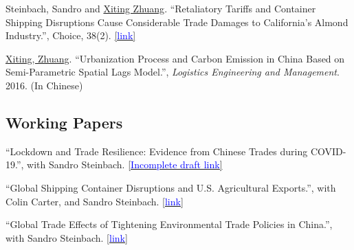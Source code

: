 \documentclass[11 pt,letterpaper]{article}
\renewenvironment{itemize}{
	\begin{list}{}{
			\setlength{\leftmargin}{1.5em}
		}
	}{
	\end{list}
}
\begin{document}
\begin{itemize}
	
	
	\item[-] Steinbach, Sandro and  \underline{Xiting Zhuang}. ``Retaliatory Tariffs and Container Shipping Disruptions Cause Considerable Trade Damages to California’s Almond Industry.'', Choice, 38(2).  	\href{https://econpapers.repec.org/scripts/redir.pf?u=https%3A%2F%2Fageconsearch.umn.edu%2Frecord%2F337188%2Ffiles%2FSteinbach_Retaliatory_38.pdf;h=repec:ags:aaeach:337188}{[{\underline{\textcolor{blue}{link}}}]}
		 	
		 \item[-]	\underline{Xiting, Zhuang}. ``Urbanization Process and Carbon Emission in China Based on Semi-Parametric Spatial Lags Model.'',   \textit{Logistics Engineering and Management}. 2016.  (In Chinese)
 

 	
 
		\end{itemize}
	
 
		
		
		
		
	\subsection*{\textbf{Working Papers}}
	
	\begin{itemize}
	

\item[-]	``Lockdown and Trade Resilience:  Evidence from Chinese Trades during COVID-19.'',  with Sandro Steinbach. 
\href{https://www.dropbox.com/scl/fi/lxdz7k05c47sskuourpxx/Manuscript.pdf?rlkey=y2d197vn9utbibgi4eqlvpxln&dl=0}{[{\underline{\textcolor{blue}{Incomplete draft link}}}]}  




	 \item[-]	``Global Shipping Container Disruptions and U.S. Agricultural Exports.'',  with Colin Carter, and Sandro Steinbach. 
	  	\href{http://dx.doi.org/10.22004/ag.econ.320397}{[{\underline{\textcolor{blue}{link}}}]}
	
	
 
 

 
	
 		
	 \item[-] ``Global Trade Effects of Tightening Environmental Trade Policies in China.'', with Sandro Steinbach. 
\href{https://www.dropbox.com/scl/fi/21o4ldsv04zo4w7bs6y5w/Manuscript.pdf?rlkey=phzrh7uhti8zm0wxpn786gu94&dl=0}{[{\underline{\textcolor{blue}{link}}}]}

 

	\end{itemize}
	
\end{document}
